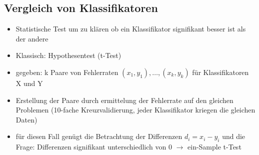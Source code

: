 \documentclass{article} %
\begin{document}
	\subsection{Vergleich von Klassifikatoren}
	\begin{itemize}
		\item Statistische Test um zu klären ob ein Klassifikator signifikant besser ist als der andere
		\item Klassisch: Hypothesentest (t-Test)
		\item gegeben: k Paare von Fehlerraten $(x_1,y_1),\dots,(x_k,y_k)$ für Klassifikatoren X und Y
		\item Erstellung der Paare durch ermittelung der Fehlerrate auf den gleichen Problemen (10-fache Kreuzvalidierung, jeder Klassifikator kriegen die gleichen Daten)
		\item für diesen Fall genügt die Betrachtung der Differenzen $d_i = x_i-y_i$ und die Frage: Differenzen signifikant unterschiedlich von 0 $\rightarrow$ ein-Sample t-Test
	\end{itemize}


\end{document}
